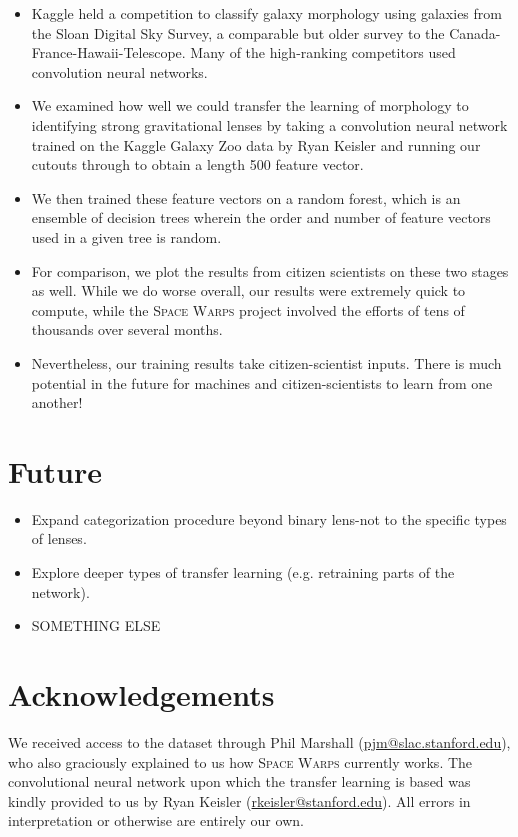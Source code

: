 \documentclass{ucbposter}
\begin{document}
\begin{itemize}
  \item{Kaggle held a competition to classify galaxy morphology using galaxies
    from the Sloan Digital Sky Survey, a comparable but older survey to the
  Canada-France-Hawaii-Telescope. Many of the high-ranking competitors used
convolution neural networks.}
  \item{We examined how well we could transfer the learning of morphology to
    identifying strong gravitational lenses by taking a convolution neural
  network trained on the Kaggle Galaxy Zoo data by Ryan Keisler and running our cutouts through
to obtain a length 500 feature vector.}
  \item{We then trained these feature vectors on a random forest, which is an
    ensemble of decision trees wherein the order and number of feature vectors
  used in a given tree is random.}
\item{For comparison, we plot the results from citizen scientists on these two
  stages as well. While we do worse overall, our results were extremely quick
 to compute, while the \textsc{Space Warps} project involved the
efforts of tens of thousands over several months.}
\item{Nevertheless, our training results take citizen-scientist inputs. There
  is much potential in the future for machines and citizen-scientists to learn
from one another!}
\end{itemize}

\section{Future}

\begin{itemize}
  \item{Expand categorization procedure beyond binary lens-not to the specific
    types of lenses.}
  \item{Explore deeper types of transfer learning (e.g. retraining parts of the
    network).}
  \item{SOMETHING ELSE}
\end{itemize}

\section{Acknowledgements}

We received access to the dataset through Phil Marshall
(\url{pjm@slac.stanford.edu}), who also graciously explained to us how
\textsc{Space Warps}
currently works. The convolutional neural network upon which the transfer
learning is based was kindly provided to us by Ryan Keisler
(\url{rkeisler@stanford.edu}).
All errors in interpretation or otherwise are entirely our own.
\end{document}
